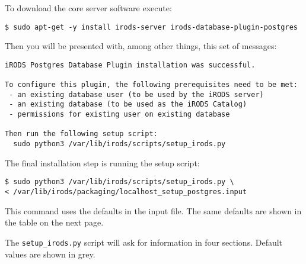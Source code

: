 \documentclass[10pt,oneside]{memoir}
\begin{document}
To download the core server software execute:

\begin{lstlisting}
$ sudo apt-get -y install irods-server irods-database-plugin-postgres
\end{lstlisting}

Then you will be presented with, among other things, this set of messages:

\begin{lstlisting}
iRODS Postgres Database Plugin installation was successful.

To configure this plugin, the following prerequisites need to be met:
 - an existing database user (to be used by the iRODS server)
 - an existing database (to be used as the iRODS Catalog)
 - permissions for existing user on existing database

Then run the following setup script:
  sudo python3 /var/lib/irods/scripts/setup_irods.py
\end{lstlisting}

The final installation step is running the setup script:

\begin{lstlisting}
$ sudo python3 /var/lib/irods/scripts/setup_irods.py \
< /var/lib/irods/packaging/localhost_setup_postgres.input
\end{lstlisting}

This command uses the defaults in the input file.  The same defaults are shown in the table on the next page.

\newpage
The \texttt{setup\_irods.py} script will ask for information in four sections.  Default values are shown in grey.
\end{document}
